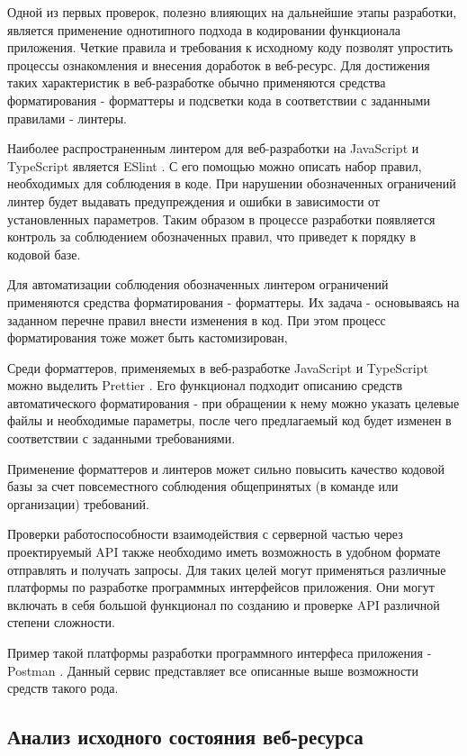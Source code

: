 Одной из первых проверок, полезно влияющих на дальнейшие этапы разработки, является применение однотипного подхода в кодировании функционала приложения.
Четкие правила и требования к исходному коду позволят упростить процессы ознакомления и внесения доработок в веб-ресурс.
Для достижения таких  характеристик в веб-разработке обычно применяются средства форматирования - форматтеры и подсветки кода в соответствии с заданными правилами - линтеры.

Наиболее распространенным линтером для веб-разработки на JavaScript и TypeScript является ESlint \cite{eslint}.
С его помощью можно описать набор правил, необходимых для соблюдения в коде.
При нарушении обозначенных ограничений линтер будет выдавать предупреждения и ошибки в зависимости от установленных параметров.
Таким образом в процессе разработки появляется контроль за соблюдением обозначенных правил, что приведет к порядку в кодовой базе.

Для автоматизации соблюдения обозначенных линтером ограничений применяются средства форматирования - форматтеры.
Их задача - основываясь на заданном перечне правил внести изменения в код.
При этом процесс форматирования тоже может быть кастомизирован,

Среди форматтеров, применяемых в веб-разработке JavaScript и TypeScript можно выделить Prettier \cite{prettier}.
Его функционал подходит описанию средств автоматического форматирования - при обращении к нему можно указать целевые файлы и необходимые параметры, после чего предлагаемый код будет изменен в соответствии с заданными требованиями.

Применение форматтеров и линтеров может сильно повысить качество кодовой базы за счет повсеместного соблюдения общепринятых (в команде или организации) требований.

Проверки работоспособности взаимодействия с серверной частью через проектируемый API также необходимо иметь возможность в удобном формате отправлять и получать запросы.
Для таких целей могут применяться различные платформы по разработке программных интерфейсов приложения.
Они могут включать в себя большой функционал по созданию и проверке API различной степени сложности.

Пример такой платформы разработки программного интерфеса приложения - Postman \cite{postman}.
Данный сервис представляет все описанные выше возможности средств такого рода.

\subsection{Анализ исходного состояния веб-ресурса}

